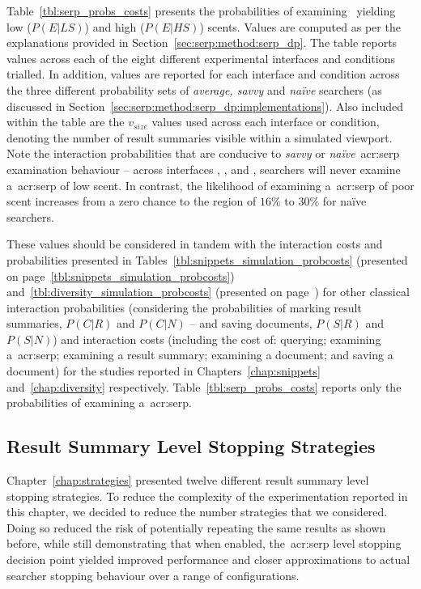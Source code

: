 Table~\ref{tbl:serp_probs_costs} presents the probabilities of examining~ yielding low ($P(E|LS)$) and high ($P(E|HS)$) scents. Values are computed as per the explanations provided in Section~\ref{sec:serp:method:serp_dp}. The table reports values across each of the eight different experimental interfaces and conditions trialled. In addition, values are reported for each interface and condition across the three different probability sets of \emph{average, savvy} and \emph{na\"{i}ve} searchers (as discussed in Section~\ref{sec:serp:method:serp_dp:implementations}). Also included within the table are the $v_{size}$ values used across each interface or condition, denoting the number of result summaries visible within a simulated viewport. Note the interaction probabilities that are conducive to \emph{savvy} or \emph{na\"{i}ve}~\gls{acr:serp} examination behaviour -- across interfaces , ,  and , searchers will never examine a~\gls{acr:serp} of low scent. In contrast, the likelihood of examining a~\gls{acr:serp} of poor scent increases from a zero chance to the region of $16\%$ to $30\%$ for na\"{i}ve searchers.

These values should be considered in tandem with the interaction costs and probabilities presented in Tables~\ref{tbl:snippets_simulation_probcosts} (presented on page~\ref{tbl:snippets_simulation_probcosts}) and~\ref{tbl:diversity_simulation_probcosts} (presented on page~\pageref{tbl:diversity_simulation_probcosts}) for other classical interaction probabilities (considering the probabilities of marking result summaries, $P(C|R)$ and $P(C|N)$ -- and saving documents, $P(S|R)$ and $P(S|N)$) and interaction costs (including the cost of: querying; examining a~\gls{acr:serp}; examining a result summary; examining a document; and saving a document) for the studies reported in Chapters~\ref{chap:snippets} and~\ref{chap:diversity} respectively. Table~\ref{tbl:serp_probs_costs} reports only the probabilities of examining a~\gls{acr:serp}.

\subsection{Result Summary Level Stopping Strategies}\label{sec:serp:method:snippet}
Chapter~\ref{chap:strategies} presented twelve different result summary level stopping strategies. To reduce the complexity of the experimentation reported in this chapter, we decided to reduce the number strategies that we considered. Doing so reduced the risk of potentially repeating the same results as shown before, while still demonstrating that when enabled, the~\gls{acr:serp} level stopping decision point yielded improved performance and closer approximations to actual searcher stopping behaviour over a range of configurations.

